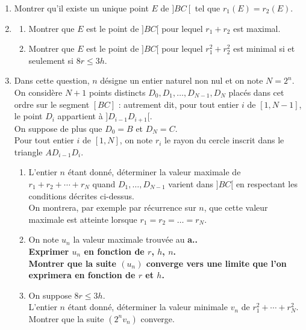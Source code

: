 \documentclass[landscape,twocolumn,leqno,a4paper,10pt]{report} %
\renewcommand{\leq}{\leqslant}
\renewcommand{\textbf}[1]{\begingroup\bfseries\mathversion{bold}#1\endgroup}		%
\begin{document}
\begin{enumerate}
	\item Montrer qu'il existe un unique point $E$ de $] B C\left[\right.$ tel que $r_{1}(E)=r_{2}(E)$.
	\item \begin{enumerate}
		\item Montrer que $E$ est le point de $]B C[$ pour lequel $r_{1}+r_{2}$ est maximal.
		\item Montrer que $E$ est le point de $]B C[$ pour lequel $r_{1}^{2}+r_{2}^{2}$ est minimal si et seulement si $8 r \leq 3 h$.
	\end{enumerate}
	\item Dans cette question, $n$ désigne un entier naturel non nul et on note $N=2^{n}$.\\
	On considère $N+1$ points distincts $D_{0}, D_{1}, \ldots, D_{N-1}, D_{N}$ placés dans cet ordre sur le segment $[B C]$ : autrement dit, pour tout entier $i$ de $[1, N-1]$, le point $D_{i}$ appartient à $]D_{i-1} D_{i+1}[$.\\
	On suppose de plus que $D_{0}=B$ et $D_{N}=C$.\\
	Pour tout entier $i$ de $[1, N]$, on note $r_{i}$ le rayon du cercle inscrit dans le triangle $A D_{i-1} D_{i}$.
	\begin{enumerate}
		\item L'entier $n$ étant donné, déterminer la valeur maximale de $r_{1}+r_{2}+\cdots+r_{N}$ quand $D_{1}, \ldots, D_{N-1}$ varient dans $]B C[$ en respectant les conditions décrites ci-dessus.\\
		On montrera, par exemple par récurrence sur $n$, que cette valeur maximale est atteinte lorsque $r_{1}=r_{2}=\ldots=r_{N}$.
		\item On note $u_{n}$ la valeur maximale trouvée au \textbf{a.}.\\
		Exprimer $u_{n}$ en fonction de $r$, $h$, $n$.\\
		Montrer que la suite $\left(u_{n}\right)$ converge vers une limite que l'on exprimera en fonction de $r$ et $h$.
		\item On suppose $8 r \leq 3 h$.\\
		L'entier $n$ étant donné, déterminer la valeur minimale $v_{n}$ de $r_{1}^{2}+\cdots+r_{N}^{2}$.\\
		Montrer que la suite $\left(2^{n} v_{n}\right)$ converge.
	\end{enumerate}
\end{enumerate}

\newpage
\end{document}
